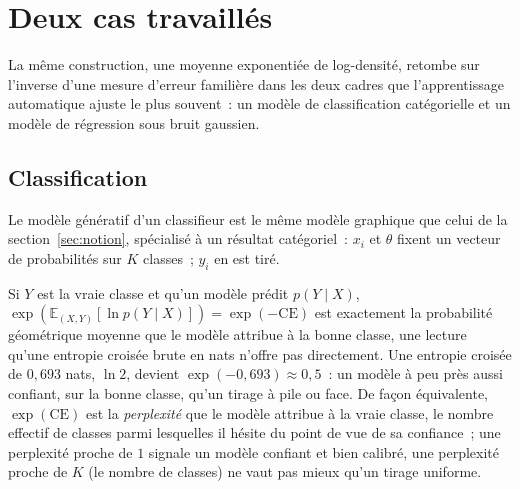 \documentclass[11pt]{article}
\begin{document}
\section{Deux cas travaillés}
\label{sec:cas}

La même construction, une moyenne exponentiée de log-densité, retombe
sur l'inverse d'une mesure d'erreur familière dans les deux cadres que
l'apprentissage automatique ajuste le plus souvent~: un modèle de
classification catégorielle et un modèle de régression sous bruit
gaussien.

\subsection{Classification}
\label{sec:classification}

Le modèle génératif d'un classifieur est le même modèle graphique que
celui de la section~\ref{sec:notion}, spécialisé à un résultat
catégoriel~: $x_i$ et $\theta$ fixent un vecteur de probabilités sur
$K$ classes~; $y_i$ en est tiré.

\begin{center}
\end{center}

Si $Y$ est la vraie classe et qu'un modèle prédit $p(Y \mid X)$,
$\exp(\mathbb E_{(X,Y)}[\ln p(Y \mid X)]) = \exp(-\mathrm{CE})$ est
exactement la probabilité géométrique moyenne que le modèle attribue à
la bonne classe, une lecture qu'une entropie croisée brute en nats
n'offre pas directement. Une entropie croisée de $0{,}693$ nats, $\ln
2$, devient $\exp(-0{,}693) \approx 0{,}5$~: un modèle à peu près aussi
confiant, sur la bonne classe, qu'un tirage à pile ou face. De façon
équivalente, $\exp(\mathrm{CE})$ est la \emph{perplexité} que le
modèle attribue à la vraie classe, le nombre effectif de classes parmi
lesquelles il hésite du point de vue de sa confiance~; une perplexité
proche de $1$ signale un modèle confiant et bien calibré, une
perplexité proche de $K$ (le nombre de classes) ne vaut pas mieux
qu'un tirage uniforme.
\end{document}
